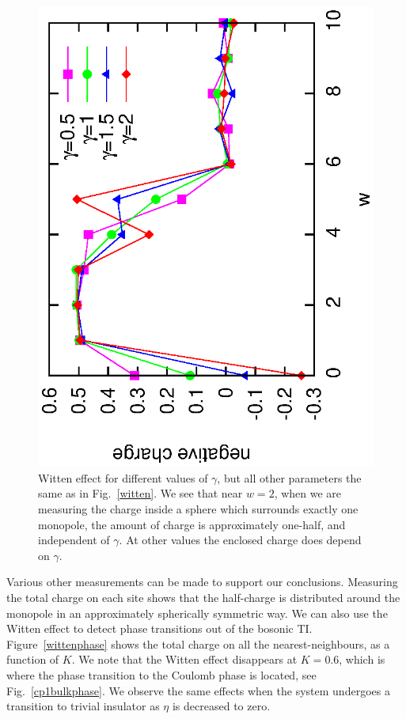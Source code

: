 \documentclass[prb,twocolumn]{revtex4-1}
\newcommand{\scripty}[1]{w}
\begin{document}
\begin{figure}
\includegraphics[angle=-90,width=0.9\linewidth]{figures/wittendiff.eps}
\caption{Witten effect for different values of $\gamma$, but all other parameters the same as in Fig.~\ref{witten}. We see that near $\scripty{r}=2$, when we are measuring the charge inside a sphere which surrounds exactly one monopole, the amount of charge is approximately one-half, and independent of $\gamma$. At other values the enclosed charge does depend on $\gamma$.}
\label{diffgamma}
\end{figure}

Various other measurements can be made to support our conclusions. Measuring the total charge on each site shows that the half-charge is distributed around the monopole in an approximately spherically symmetric way. We can also use the Witten effect to detect phase transitions out of the bosonic TI. Figure~\ref{wittenphase} shows the total charge on all the nearest-neighbours, as a function of $K$. We note that the Witten effect disappears at $K=0.6$, which is where the phase transition to the Coulomb phase is located, see Fig.~\ref{cp1bulkphase}. We observe the same effects when the system undergoes a transition to trivial insulator as $\eta$ is decreased to zero.
\end{document}
